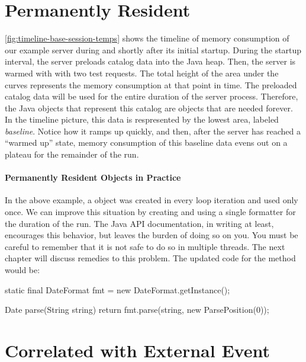 \section{Permanently Resident}
\label{sec:forever-lifetime}

\autoref{fig:timeline-base-session-temps} shows the timeline of memory
consumption of our example server 
during and shortly after its initial startup.
During the startup interval, the server preloads catalog data into
the Java heap. Then, the server is warmed with with two test requests.
The total height of the area
under the curves represents the memory consumption at that point in time. 
The preloaded catalog
data will be used for the entire duration of the server process.
Therefore, the Java objects that represent this catalog are objects that are
needed forever. In the timeline picture, this data is respresented by the lowest area, labeled
\emph{baseline}. Notice how it ramps up quickly, and then, after the server has
reached a ``warmed up'' state, memory consumption of this baseline data evens out
on a plateau for the remainder of the run.

\paragraph{Permanently Resident Objects in Practice}

In the above example, a  object was created in every loop
iteration and used only once. We can improve this situation by creating and using
a single formatter for the duration of the run. The Java API documentation, in
writing at least, encourages this behavior, but leaves the burden of doing so on
you. You must be careful to remember that it is not safe to do so in multiple
threads. The next chapter will discuss remedies to this problem. The updated code
for the  method would be:

\begin{shortlisting}
static final DateFormat fmt = new DateFormat.getInstance();

Date parse(String string) {
	return fmt.parse(string, new ParsePosition(0));
}
\end{shortlisting} 


\section{Correlated with External Event}
\label{sec:correlated-with-need}

